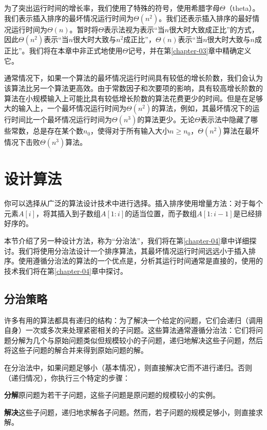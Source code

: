 \documentclass[lang=cn,newtx,10pt,scheme=chinese]{elegantbook}
\begin{document}
为了突出运行时间的增长率，我们使用了特殊的符号，使用希腊字母$\Theta$（theta）。我们表示插入排序的最坏情况运行时间为$\Theta(n^2)$。我们还表示插入排序的最好情况运行时间为$\Theta(n)$。暂时将$\Theta$表示法视为表示``当$n$很大时大致成正比''的方式，因此$\Theta(n^2)$表示``当$n$很大时大致与$n^2$成正比''，$\Theta(n)$表示``当$n$很大时大致与$n$成正比''。我们将在本章中非正式地使用$\Theta$记号，并在第\ref{chapter-03}章中精确定义它。

通常情况下，如果一个算法的最坏情况运行时间具有较低的增长阶数，我们会认为该算法比另一个算法更高效。由于常数因子和次要项的影响，具有较高增长阶数的算法在小规模输入上可能比具有较低增长阶数的算法花费更少的时间。但是在足够大的输入上，一个最坏情况运行时间为$\Theta(n^2)$的算法，例如，其最坏情况下的运行时间比一个最坏情况运行时间为$\Theta(n^3)$的算法更少。无论$\Theta$表示法中隐藏了哪些常数，总是存在某个数$n_0$，使得对于所有输入大小$n\ge n_0$，$\Theta(n^2)$算法在最坏情况下击败$\Theta(n^3)$算法。

\section{设计算法}\label{section-2.3}

你可以选择从广泛的算法设计技术中进行选择。插入排序使用增量方法：对于每个元素$A[i]$，将其插入到子数组$A[1:i]$的适当位置，而子数组$A[1:i-1]$是已经排好序的。

本节介绍了另一种设计方法，称为``分治法''，我们将在第\ref{chapter-04}章中详细探讨。我们将使用分治法设计一个排序算法，其最坏情况运行时间远远小于插入排序。使用遵循分治法的算法的一个优点是，分析其运行时间通常是直接的，使用的技术我们将在第\ref{chapter-04}章中探讨。

\subsection{分治策略}\label{subsection-2.3.1}

许多有用的算法都具有递归的结构：为了解决一个给定的问题，它们会递归（调用自身）一次或多次来处理紧密相关的子问题。这些算法通常遵循分治法：它们将问题分解为几个与原始问题类似但规模较小的子问题，递归地解决这些子问题，然后将这些子问题的解合并来得到原始问题的解。

在分治法中，如果问题足够小（基本情况），则直接解决它而不进行递归。否则（递归情况），你执行三个特定的步骤：

\textbf{分解}原问题为若干子问题，这些子问题是原问题的规模较小的实例。

\textbf{解决}这些子问题，递归地求解各子问题。然而，若子问题的规模足够小，则直接求解。
\end{document}
